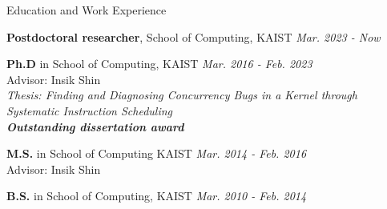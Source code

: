 
\begin{rSection}{Education and Work Experience}

\textbf{Postdoctoral researcher}, School of Computing, KAIST \hfill {\em Mar. 2023 - Now} 

\textbf{Ph.D} in School of Computing, KAIST \hfill {\em Mar. 2016 - Feb. 2023} \\
\setlength{\leftskip}{10pt} Advisor: Insik Shin \\
\textit{Thesis: Finding and Diagnosing Concurrency Bugs in a Kernel through Systematic Instruction Scheduling} \\
\textbf{\textit{Outstanding  dissertation award}}

\setlength{\leftskip}{0pt}
\textbf{M.S.} in School of Computing KAIST \hfill {\em Mar. 2014 - Feb. 2016} \\
\setlength{\leftskip}{10pt} Advisor: Insik Shin

\setlength{\leftskip}{0pt}
\textbf{B.S.} in School of Computing, KAIST \hfill {\em Mar. 2010 - Feb. 2014}

\end{rSection}
